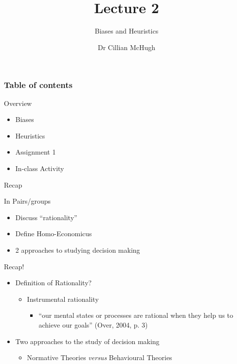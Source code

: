 \documentclass[
  ignorenonframetext,
]{beamer}
\title{Lecture 2}
\subtitle{Biases and Heuristics}
\author{Dr Cillian McHugh}
\date{}
\institute{PS4168: Economic Psychology}
\providecommand{\tightlist}{%
  \setlength{\itemsep}{0pt}\setlength{\parskip}{0pt}}\usepackage{longtable,booktabs,array}
\renewcommand*\contentsname{Table of contents}
\newcommand\contentsname{Table of contents}
\begin{document}
\frame{\titlepage}
\ifdefined\Shaded\renewenvironment{Shaded}{\begin{tcolorbox}[interior hidden, borderline west={3pt}{0pt}{shadecolor}, boxrule=0pt, enhanced, breakable, frame hidden, sharp corners]}{\end{tcolorbox}}\fi

\renewcommand*\contentsname{Table of contents}
\begin{frame}[allowframebreaks]
  \frametitle{Table of contents}
  \tableofcontents[hideallsubsections]
\end{frame}
\begin{frame}{Overview}
\protect\hypertarget{overview}{}
\begin{itemize}
\item
  Biases
\item
  Heuristics
\item
  Assignment 1
\item
  In-class Activity
\end{itemize}
\end{frame}

\begin{frame}{Recap}
\protect\hypertarget{recap}{}
\begin{block}{In Pairs/groups}
\protect\hypertarget{in-pairsgroups}{}
\begin{itemize}
\tightlist
\item
  Discuss ``rationality''
\item
  Define Homo-Economicus
\item
  2 approaches to studying decision making
\end{itemize}
\end{block}
\end{frame}

\begin{frame}{Recap!}
\protect\hypertarget{recap-1}{}
\begin{itemize}
\tightlist
\item
  Definition of Rationality?

  \begin{itemize}
  \tightlist
  \item
    Instrumental rationality

    \begin{itemize}
    \tightlist
    \item
      ``our mental states or processes are rational when they help us to
      achieve our goals'' (Over, 2004, p. 3)
    \end{itemize}
  \end{itemize}
\item
  Two approaches to the study of decision making

  \begin{itemize}
  \tightlist
  \item
    Normative Theories \emph{versus} Behavioural Theories
  \end{itemize}
\end{itemize}
\end{frame}
\end{document}
